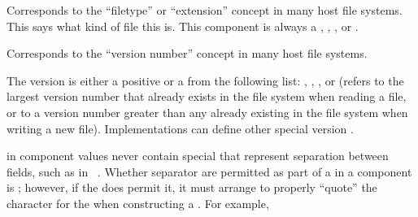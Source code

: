 
\endsubsubsection%


Corresponds to the ``filetype'' or ``extension'' concept in many host
file systems.  This says what kind of file this is.  
This component is always a , \nil, , or .


\endsubsubsection%


Corresponds to the ``version number'' concept in many host file systems.

The version is either a positive  
or a  from the following list:
\nil, , , or 
(refers to the largest version number that already exists in 
the file system when reading a file, or to
a version number
greater than any already existing in the file system
when writing a new file).  Implementations 
can define other special version .


\endsubsubsection%

\endSubsection%





 in  component values 
never contain special  that represent
separation between  fields, 
such as  in \Unix\ .
Whether separator  are permitted as 
part of a  in a  component
is ; 
however, if the  does permit it, 
it must arrange to properly ``quote'' the character for the 
 when constructing a .
For example,

